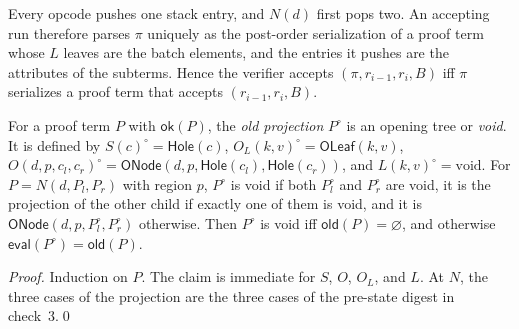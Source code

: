 \documentclass[runningheads]{llncs}
\newcommand{\eval}{\mathsf{eval}}
\newcommand{\Hole}{\mathsf{Hole}}
\newcommand{\OLeaf}{\mathsf{OLeaf}}
\newcommand{\ONode}{\mathsf{ONode}}
\newcommand{\Old}{\mathsf{old}}
\newcommand{\Ok}{\mathsf{ok}}
\begin{document}
Every opcode pushes one stack entry, and $N(d)$ first pops two. An accepting run therefore parses $\pi$ uniquely as the post-order serialization of a proof term whose $L$ leaves are the batch elements, and the entries it pushes are the attributes of the subterms. Hence the verifier accepts $(\pi, r_{i-1}, r_i, B)$ iff $\pi$ serializes a proof term that accepts $(r_{i-1}, r_i, B)$.

\begin{lemma}\label{lem:proj}
For a proof term $P$ with $\Ok(P)$, the \emph{old projection} $P^{\circ}$ is an opening tree or \emph{void}. It is defined by $S(c)^{\circ} = \Hole(c)$, $O_L(k,v)^{\circ} = \OLeaf(k,v)$, $O(d,p,c_l,c_r)^{\circ} = \ONode(d,p,\Hole(c_l),\Hole(c_r))$, and $L(k,v)^{\circ} = \text{void}$. For $P = N(d,P_l,P_r)$ with region $p$, $P^{\circ}$ is void if both $P_l^{\circ}$ and $P_r^{\circ}$ are void, it is the projection of the other child if exactly one of them is void, and it is $\ONode(d,p,P_l^{\circ},P_r^{\circ})$ otherwise. Then $P^{\circ}$ is void iff $\Old(P) = \varnothing$, and otherwise $\eval(P^{\circ}) = \Old(P)$.
\end{lemma}
\begin{proof}
Induction on $P$. The claim is immediate for $S$, $O$, $O_L$, and $L$. At $N$, the three cases of the projection are the three cases of the pre-state digest in check~3.\qed
\end{proof}
\end{document}

